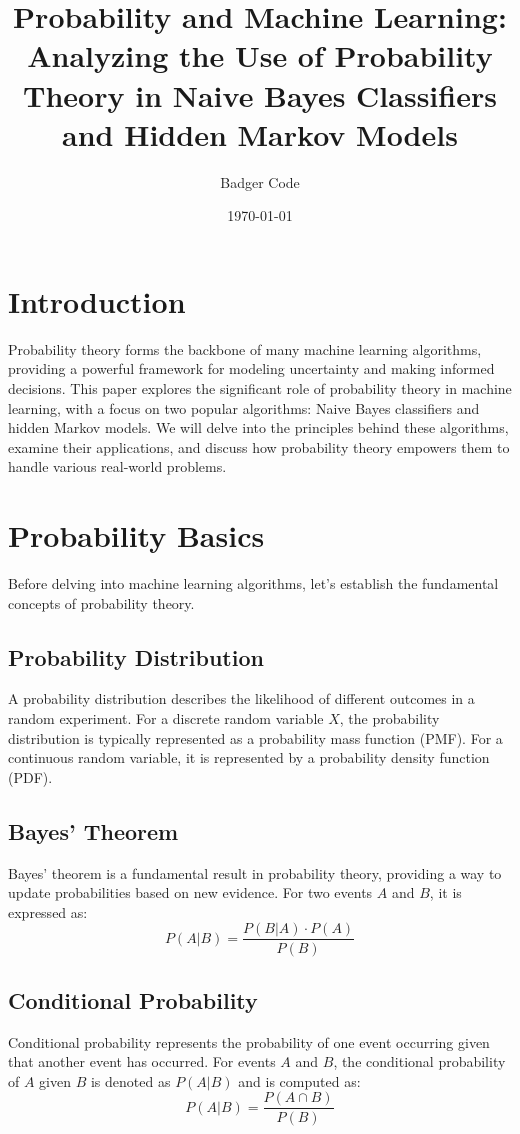 \documentclass{article}
\title{Probability and Machine Learning: \\
       Analyzing the Use of Probability Theory in Naive Bayes Classifiers and Hidden Markov Models}
\author{Badger Code}
\date{\today}
\begin{document}
\maketitle

\section{Introduction}
Probability theory forms the backbone of many machine learning algorithms, providing a powerful framework for modeling uncertainty and making informed decisions. This paper explores the significant role of probability theory in machine learning, with a focus on two popular algorithms: Naive Bayes classifiers and hidden Markov models. We will delve into the principles behind these algorithms, examine their applications, and discuss how probability theory empowers them to handle various real-world problems.

\section{Probability Basics}
Before delving into machine learning algorithms, let's establish the fundamental concepts of probability theory.

\subsection{Probability Distribution}
A probability distribution describes the likelihood of different outcomes in a random experiment. For a discrete random variable $X$, the probability distribution is typically represented as a probability mass function (PMF). For a continuous random variable, it is represented by a probability density function (PDF).

\subsection{Bayes' Theorem}
Bayes' theorem is a fundamental result in probability theory, providing a way to update probabilities based on new evidence. For two events $A$ and $B$, it is expressed as:
\[ P(A|B) = \frac{P(B|A) \cdot P(A)}{P(B)} \]

\subsection{Conditional Probability}
Conditional probability represents the probability of one event occurring given that another event has occurred. For events $A$ and $B$, the conditional probability of $A$ given $B$ is denoted as $P(A|B)$ and is computed as:
\[ P(A|B) = \frac{P(A \cap B)}{P(B)} \]
\end{document}
